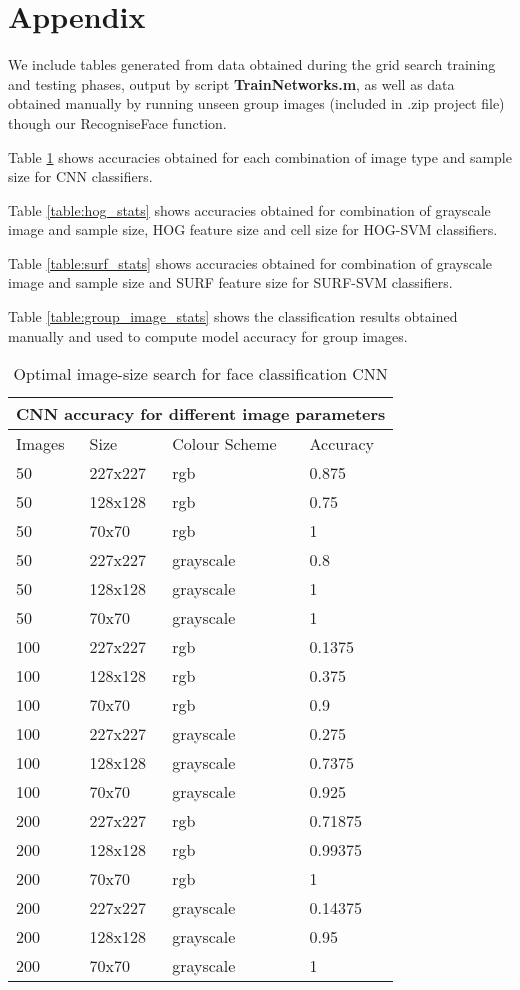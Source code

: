 \appendix
\section{Appendix}
\label{Appendix}

We include tables generated from data obtained during the grid search training and testing phases, output by script \textbf{TrainNetworks.m}, as well as data obtained manually by running unseen group images (included in .zip project file) though our RecogniseFace function.

Table \ref{table:cnn_stats} shows accuracies obtained for each combination of image type and sample size for CNN classifiers.  

Table \ref{table:hog_stats} shows accuracies obtained for combination of grayscale image and sample size, HOG feature size and cell size for HOG-SVM classifiers.  

Table \ref{table:surf_stats} shows accuracies obtained for combination of grayscale image and sample size and SURF feature size for SURF-SVM classifiers.  

Table \ref{table:group_image_stats} shows the classification results obtained manually and used to compute model accuracy for group images.

\begin{table}[ht]
\centering
\begin{tabular}{|l|l|l|l|}
\hline
\multicolumn{4}{|l|}{CNN accuracy for different image parameters} \\ \hline
Images  &  Size & Colour Scheme & Accuracy \\ \hline
50 & 227x227 & rgb & 0.875 \\ \hline
50 & 128x128 & rgb & 0.75 \\ \hline
50 & 70x70 & rgb & 1 \\ \hline
50 & 227x227 & grayscale & 0.8 \\ \hline
50 & 128x128 & grayscale & 1 \\ \hline
50 & 70x70 & grayscale & 1 \\ \hline
100 & 227x227 & rgb & 0.1375 \\ \hline
100 & 128x128 & rgb & 0.375 \\ \hline
100 & 70x70 & rgb & 0.9 \\ \hline
100 & 227x227 & grayscale & 0.275 \\ \hline
100 & 128x128 & grayscale & 0.7375 \\ \hline
100 & 70x70 & grayscale & 0.925 \\ \hline
200 & 227x227 & rgb & 0.71875 \\ \hline
200 & 128x128 & rgb & 0.99375 \\ \hline
200 & 70x70 & rgb & 1 \\ \hline
200 & 227x227 & grayscale & 0.14375 \\ \hline
200 & 128x128 & grayscale & 0.95 \\ \hline
200 & 70x70 & grayscale & 1 \\ \hline
\end{tabular}
\caption{Optimal image-size search for face classification CNN}
\label{table:cnn_stats}
\end{table}

